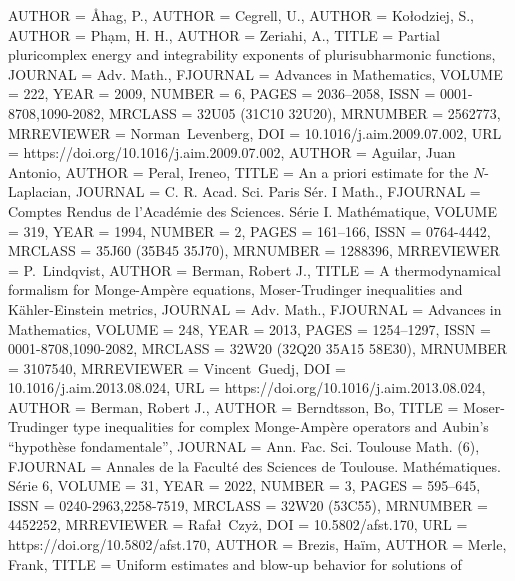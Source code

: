 \documentclass[11pt]{amsart}
\numberwithin{equation}{section}
\numberwithin{equation}{section}
\begin{document}
\begin{bibdiv}
\begin{biblist}
 {
    AUTHOR = {\AA hag, P.},
    AUTHOR = {Cegrell, U.},
    AUTHOR = {Ko\l odziej, S.},
    AUTHOR = {Ph\d am, H. H.},
     AUTHOR = {Zeriahi, A.},
     TITLE = {Partial pluricomplex energy and integrability exponents of
              plurisubharmonic functions},
   JOURNAL = {Adv. Math.},
  FJOURNAL = {Advances in Mathematics},
    VOLUME = {222},
      YEAR = {2009},
    NUMBER = {6},
     PAGES = {2036--2058},
      ISSN = {0001-8708,1090-2082},
   MRCLASS = {32U05 (31C10 32U20)},
  MRNUMBER = {2562773},
MRREVIEWER = {Norman\ Levenberg},
       DOI = {10.1016/j.aim.2009.07.002},
       URL = {https://doi.org/10.1016/j.aim.2009.07.002},
}
 {
	AUTHOR = {Aguilar, Juan Antonio},
	AUTHOR = {Peral, Ireneo},
	TITLE = {An a priori estimate for the {$N$}-{L}aplacian},
	JOURNAL = {C. R. Acad. Sci. Paris S\'er. I Math.},
	FJOURNAL = {Comptes Rendus de l'Acad\'emie des Sciences. S\'erie I.
		Math\'ematique},
	VOLUME = {319},
	YEAR = {1994},
	NUMBER = {2},
	PAGES = {161--166},
	ISSN = {0764-4442},
	MRCLASS = {35J60 (35B45 35J70)},
	MRNUMBER = {1288396},
	MRREVIEWER = {P.\ Lindqvist},
}
 {
	AUTHOR = {Berman, Robert J.},
	TITLE = {A thermodynamical formalism for {M}onge-{A}mp\`ere equations,
		{M}oser-{T}rudinger inequalities and {K}\"ahler-{E}instein
		metrics},
	JOURNAL = {Adv. Math.},
	FJOURNAL = {Advances in Mathematics},
	VOLUME = {248},
	YEAR = {2013},
	PAGES = {1254--1297},
	ISSN = {0001-8708,1090-2082},
	MRCLASS = {32W20 (32Q20 35A15 58E30)},
	MRNUMBER = {3107540},
	MRREVIEWER = {Vincent\ Guedj},
	DOI = {10.1016/j.aim.2013.08.024},
	URL = {https://doi.org/10.1016/j.aim.2013.08.024},
}
 {
    AUTHOR = {Berman, Robert J.},
        AUTHOR = {Berndtsson, Bo},
     TITLE = {Moser-{T}rudinger type inequalities for complex
              {M}onge-{A}mp\`ere operators and {A}ubin's ``hypoth\`ese
              fondamentale''},
   JOURNAL = {Ann. Fac. Sci. Toulouse Math. (6)},
  FJOURNAL = {Annales de la Facult\'e{} des Sciences de Toulouse.
              Math\'ematiques. S\'erie 6},
    VOLUME = {31},
      YEAR = {2022},
    NUMBER = {3},
     PAGES = {595--645},
      ISSN = {0240-2963,2258-7519},
   MRCLASS = {32W20 (53C55)},
  MRNUMBER = {4452252},
MRREVIEWER = {Rafa\l\ Czy\.z},
       DOI = {10.5802/afst.170},
       URL = {https://doi.org/10.5802/afst.170},
}
 {
	AUTHOR = {Brezis, Ha\"im},
	AUTHOR = {Merle, Frank},
	TITLE = {Uniform estimates and blow-up behavior for solutions of
}}
\end{biblist}
\end{bibdiv}
\end{document}
